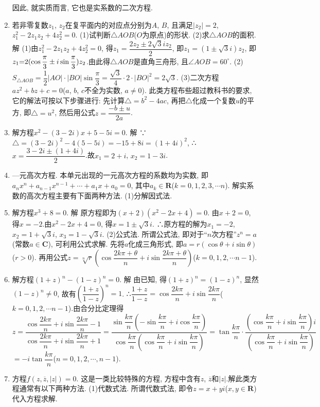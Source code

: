 \documentclass[10pt,a4paper]{article}
\begin{document}
\begin{enumerate}[1.]
因此, 就实质而言, 它也是实系数的二次方程.
\item 若非零复数$z_1$, $z_2$在复平面内的对应点分别为$A$, $B$, 且满足$|z_2|=2$, $z_1^2-2z_1z_2+4z_2^2=0$.
(1)试判断$\triangle AOB$($O$为原点)的形状.	(2)求$\triangle AOB$的面积.
解  (1)由$z_1^2-2z_1z_2+4z_2^2=0$, 得$z_1=\dfrac{2z_2\pm 2\sqrt 3iz_2}2$, 即$z_1=(1\pm \sqrt 3i)z_2$,
即$z_1\text=2(\cos \dfrac{\pi }3\pm i\sin \dfrac{\pi }3)z_2$.由此得$\triangle AOB$是直角三舟形, 且$\angle AOB=60^{\circ }$.
(2)$S_{\triangle AOB}=\dfrac 12|AO|\cdot|BO|\sin \dfrac{\pi }3=\dfrac{\sqrt 3}4\cdot 2\cdot|BO|^2=2\sqrt 3$.
(3)二次方程$az^2+bz+c=0$($a$, $b$, $c$不全为实数, $a\ne 0$).
此类方程布些超过教科书的要求, 它的解法可按以下步骤进行:
先计算$\triangle =b^2-4ac$, 再把$\triangle$化成一个复数$u$的平方, 即$\triangle =u^2$,
然后用公式$z=\dfrac{-b\pm u}{2a}$.
\item 解方程$x^2-(3-2i)x+5-5i=0$.
解  ∵$\triangle =(3-2i)^2-4(5-5i)=-15+8i=(1+4i)^2$,
∴$x=\dfrac{3-2i\pm (1+4i)}2$.故$x_1=2+i$, $x_2=1-3i$.
\item —元高次方程.
本单元出现的一元高次方程的系数均为实数, 即$a_nx^n+a_{n-1}x^{n-1}+\cdots +a_1x+a_0=0$, 其中$a_k\in \mathbf{R}$($k=0,1,2,3,\cdots n$).
解实系数的高次方程主要有下面两种方法.
(1)分解因式法.
\item 解方程$x^3+8=0$.
解  原方程即为$(x+2)(x^2-2x+4)=0$.
由$x+2=0$, 得$x=-2$.由$x^2-2x+4=0$, 得$x=1\pm \sqrt 3i$.
∴原方程的解为$x_1=-2$, $x_2=1+\sqrt 3i$, $x_3=1-\sqrt 3i$.
(2)公式法.
所谓公式法, 即对于``$n$次方程''$z^n=a$(常数$a\in \mathbf{C}$), 可利用公式求解.
先将$a$化成三角形式, 即$a=r(\cos \theta +i\sin \theta)$($r>0$).
再用公式$z=\sqrt[n]r(\cos \dfrac{2k\pi +\theta }n+i\sin \dfrac{2k\pi +\theta }n)$($k=0,1,2,\cdots n-1$).
\item 解方程$(1+z)^n-(1-z)^n=0$.
解  由已知, 得$(1+z)^n=(1-z)^n$, 显然$(1-z)^n\ne 0$, 故有$(\dfrac{1+z}{1-z})^n=1$.
∴$\dfrac{1+z}{1-z}=\cos \dfrac{2k\pi }n+i\sin \dfrac{2k\pi }n$($k=0,1,2,\cdots n-1$).由合分比定理得
$z=\dfrac{\cos \dfrac{2k\pi }n+i\sin \dfrac{2k\pi }n-1}{\cos \dfrac{2k\pi }n+i\sin \dfrac{2k\pi }n+1}=\dfrac{\sin \dfrac{k\pi }n(-\sin \dfrac{k\pi }n+i\cos \dfrac{k\pi }n)}{\cos \dfrac{k\pi }n(\cos \dfrac{k\pi }n+i\sin \dfrac{k\pi }n)}=\tan \dfrac{k\pi }n\cdot \dfrac{(\cos \dfrac{k\pi }n+i\sin \dfrac{k\pi }n)i}{(\cos \dfrac{k\pi }n+i\sin \dfrac{k\pi }n)}$
 $=-i\tan \dfrac{k\pi }n$($n=0,1,2,\cdots ,n-1$).
\item 方程$f(z,\overline z,|z|)=0$.
这是一类比较特殊的方程, 方程中含有$z$, $\overline z$和$|z|$.解此类方程通常有以下两种方法.
(1)代数式法.
所谓代数式法, 即令$z=x+yi$($x,y\in \mathbf{R}$)代入方程求解.

\end{enumerate}
\end{document}
